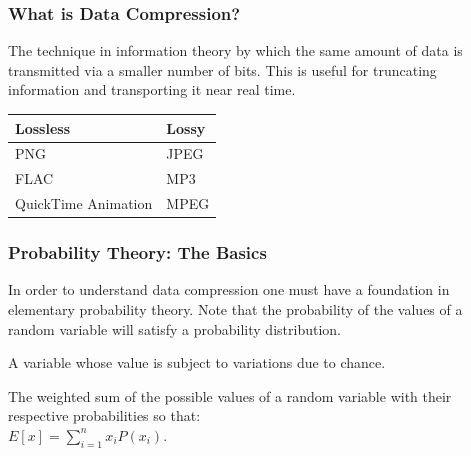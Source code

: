 \documentclass{beamer}
\theoremstyle{definition}
\begin{document}
\begin{frame}

\frametitle{What is Data Compression?}

\begin{definition}
The technique in information theory by which the same amount of data is transmitted via a smaller number of bits. This is useful for truncating information and transporting it near real time.
\end{definition}

\pause

\begin{center}
\begin{tabular}{ | l | l|  }
\hline
Lossless & Lossy \\ \hline
PNG & JPEG \\
FLAC & MP3 \\
QuickTime Animation & MPEG \\
\hline
\end{tabular}
\end{center}

\end{frame}

\begin{frame}

\frametitle{Probability Theory: The Basics}
In order to understand data compression one must have a foundation in elementary probability theory.
Note that the probability of the values of a random variable will satisfy a probability distribution.

\pause

\begin{definition}
A variable whose value is subject to variations due to chance.
\end{definition}

\pause

\begin{definition}
The weighted sum of the possible values of a random variable with their respective probabilities so that: \\\center$E[x]=\sum\limits_{i=1}^{n}{x_{i}P(x_{i})}$.
\end{definition}

\end{frame}
\end{document}
